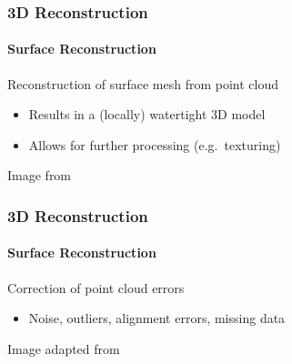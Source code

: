 \documentclass[xetex,professionalfont]{beamer}
\begin{document}

\begin{frame}
\frametitle{3D Reconstruction}
\framesubtitle{Surface Reconstruction}

Reconstruction of surface mesh from point cloud
\begin{itemize}
    \item Results in a (locally) watertight 3D model %
    \item Allows for further processing (e.g.\ texturing)
\end{itemize}

\bigskip
\begin{center}
    {\centering Image from \cite{kazhdan2005}}
\end{center}

\end{frame}


\begin{frame}
\frametitle{3D Reconstruction}
\framesubtitle{Surface Reconstruction}

Correction of point cloud errors
\begin{itemize}
    \item Noise, outliers, alignment errors, missing data
\end{itemize}

\bigskip
\begin{center}
    {\centering Image adapted from \cite{berger2014}} %
\end{center}

\end{frame}
\end{document}
